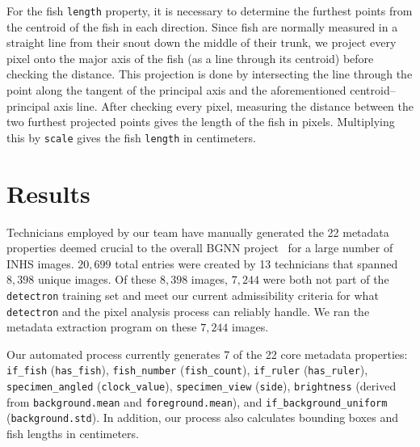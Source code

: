 \documentclass[conference]{IEEEtran}
\begin{document}
For the fish \verb|length| property, it is necessary to determine the furthest points from the centroid of the fish in each direction. Since fish are normally measured in a straight line from their snout down the middle of their trunk, we project every pixel onto the major axis of the fish (as a line through its centroid) before checking the distance. This projection is done by intersecting the line through the point along the tangent of the principal axis and the aforementioned centroid--principal axis line. After checking every pixel, measuring the distance between the two furthest projected points gives the length of the fish in pixels. Multiplying this by \verb|scale| gives the fish \verb|length| in centimeters.

\section{Results}
Technicians employed by our team have manually generated the 22 metadata properties deemed crucial to the overall BGNN project~\cite{Leipzig2021.01.28.428644} for a large number of INHS images. \(20,699\) total entries were created by 13 technicians that spanned \(8,398\) unique images. Of these \(8,398\) images, \(7,244\) were both not part of the \verb|detectron| training set and meet our current admissibility criteria for what \verb|detectron| and the pixel analysis process can reliably handle. We ran the metadata extraction program on these \(7,244\) images.

Our automated process currently generates 7 of the 22 core metadata properties: \verb|if_fish| (\verb|has_fish|), \verb|fish_number| (\verb|fish_count|), \verb|if_ruler| (\verb|has_ruler|), \verb|specimen_angled| (\verb|clock_value|), \verb|specimen_view| (\verb|side|), \verb|brightness| (derived from \verb|background.mean| and \verb|foreground.mean|), and \verb|if_background_uniform| (\verb|background.std|). In addition, our process also calculates bounding boxes and fish lengths in centimeters.
\end{document}
